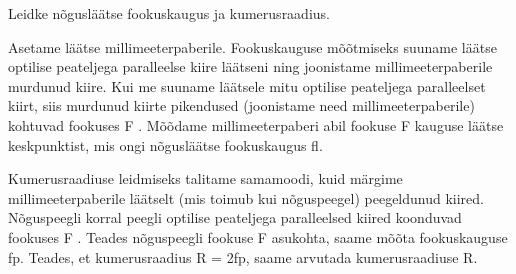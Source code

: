 
Leidke nõgusläätse fookuskaugus ja kumerusraadius.

\hint

\solu
Asetame läätse millimeeterpaberile. Fookuskauguse mõõtmiseks suuname läätse optilise peateljega paralleelse kiire läätseni ning joonistame millimeeterpaberile murdunud kiire. Kui me suuname läätsele mitu optilise peateljega paralleelset kiirt, siis murdunud kiirte pikendused (joonistame need millimeeterpaberile) kohtuvad fookuses F . Mõõdame millimeeterpaberi abil fookuse F kauguse läätse keskpunktist, mis ongi nõgusläätse fookuskaugus fl.

Kumerusraadiuse leidmiseks talitame samamoodi, kuid märgime millimeeterpaberile läätselt (mis toimub kui nõguspeegel) peegeldunud kiired. Nõguspeegli korral peegli optilise peateljega paralleelsed kiired koonduvad fookuses F . Teades nõguspeegli fookuse F asukohta, saame mõõta fookuskauguse fp. Teades, et kumerusraadius R = 2fp, saame arvutada kumerusraadiuse R.
\probend

